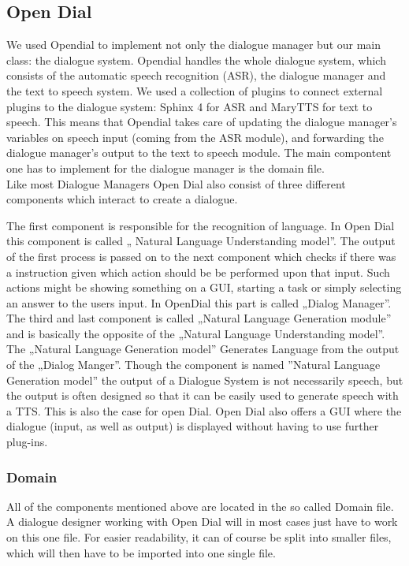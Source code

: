 \documentclass[a4paper, 12pt]{article}
\begin{document}
\subsection{Open Dial}

We used Opendial to implement not only the dialogue manager but our main class: the dialogue system. Opendial handles the whole dialogue system, which consists of the automatic speech recognition (ASR), the dialogue manager and the text to speech system. We used a collection of plugins to connect external plugins to the dialogue system: Sphinx 4 for ASR and MaryTTS for text to speech. This means that Opendial takes care of updating the dialogue manager's variables on speech input (coming from the ASR module), and forwarding the dialogue manager's output to the text to speech module. The main compontent one has to implement for the dialogue manager is the domain file. \\

Like most Dialogue Managers Open Dial also consist of three different components which interact to create a dialogue. 

The first component is responsible for the recognition of language. 
In Open Dial this component is called „ Natural Language Understanding model”. 
The output of the first process is passed on to the next component which checks if there was a instruction given which action should be  be performed upon that input. 
Such actions might be showing something on a GUI, starting a task or simply selecting an answer to the users input. 
In OpenDial this part is called „Dialog Manager”.
The third and last component is called „Natural Language Generation module” and is basically the opposite of the „Natural Language Understanding model”. 
The „Natural Language Generation model” Generates Language from the output of the „Dialog Manger”. 
Though the component is named ”Natural Language Generation model” the output of a Dialogue System is not necessarily speech, but the output is often designed so that it can be easily used to generate speech with a TTS. 
This is also the case for open Dial. 
Open Dial also offers a GUI where the dialogue (input, as well as output) is displayed without having to use further plug-ins.

\subsubsection{Domain}

All of the components mentioned above are located in the so called Domain file.
A dialogue designer working with Open Dial will in most cases just have to work on this one file. For easier readability, it can of course be split into smaller files, which will then have to be imported into one single file. \newline
\end{document}
